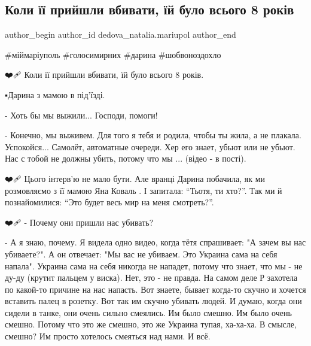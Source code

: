  
 
 
 
 

\subsection{Коли її прийшли вбивати, їй було всього 8 років}
\label{sec:29_01_2023.fb.dedova_natalia.mariupol.1.koli___priishli_vbi}

\ifcmt
 author_begin
   author_id dedova_natalia.mariupol
 author_end
\fi

\#міймаріуполь
\#голосимирних
\#дарина
\#шобвоноздохло

❤️🩹 Коли її прийшли вбивати, їй було всього 8 років.

▪️Дарина з мамою в під'їзді. 

- Хоть бы мы выжили... Господи, помоги!

- Конечно, мы выживем. Для того я тебя и родила, чтобы ты жила, а не плакала.
Успокойся... Самолёт, автоматные очереди. Хер его знает, убьют или не убьют.
Нас с тобой не должны убить, потому что мы ... (відео - в пості). 

❤️🩹 Цього інтерв'ю не мало бути. Але вранці Дарина побачила, як ми
розмовляємо з її мамою Яна Коваль . І запитала: \enquote{Тьотя, ти хто?}. Так ми й
познайомилися: \enquote{Это будет весь мир на меня смотреть?}. 

❤️🩹 - Почему они пришли нас убивать?

- А я знаю, почему. Я видела одно видео, когда тётя спрашивает: "А зачем вы нас
убиваете?". А он отвечает: "Мы вас не убиваем. Это Украина сама на себя
напала". Украина сама на себя никогда не нападет, потому что знает, что мы - не
ду-ду (крутит пальцем у виска). Нет, это - не правда. На самом деле Р захотела
по какой-то причине на нас напасть. Вот знаете, бывает когда-то скучно и
хочется вставить палец в розетку. Вот так им скучно убивать людей. И думаю,
когда они сидели в танке, они очень сильно смеялись. Им было смешно. Им было
очень смешно. Потому что это же смешно, это же Украина тупая, ха-ха-ха. В
смысле, смешно? Им просто хотелось смеяться над нами. И всё.

